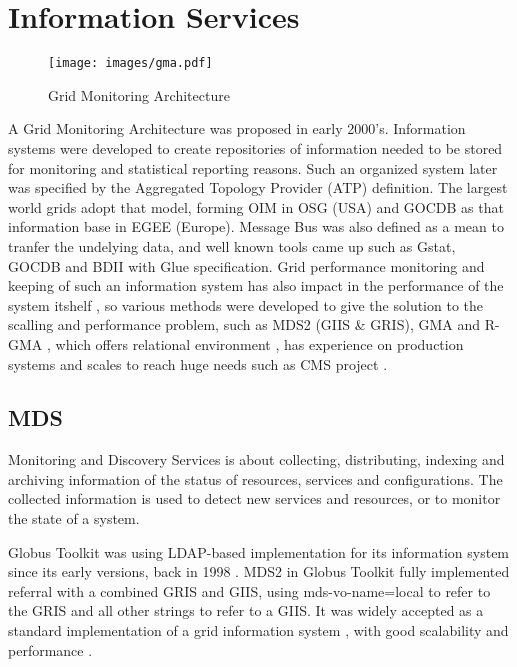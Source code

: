 \section{Information Services}
\begin{figure}[htb]
\centering
 \texttt{[image: images/gma.pdf]}
\caption{Grid Monitoring Architecture}
\label{figure:gma}
\end{figure}
A Grid Monitoring Architecture \cite{tierney2002grid} was proposed in early
2000's. Information systems were developed to create repositories of information
needed to be stored for monitoring and statistical reporting reasons. Such an
organized system later was specified by the Aggregated Topology Provider (ATP)
definition. The largest world grids adopt that model, forming OIM in OSG (USA)
and GOCDB as that information base in EGEE (Europe). Message Bus was also
defined as a mean to tranfer the undelying data, and well known tools came up
such as Gstat, GOCDB and BDII with Glue specification. Grid performance
monitoring and keeping of such an information system has also impact in the
performance of the system itshelf \cite{zhang2003performance}, so various
methods were developed to give the solution to the scalling and performance
problem, such as MDS2 (GIIS \& GRIS), GMA and R-GMA
\cite{wilson2004information}, which offers relational environment
\cite{fisher2001relational}, has experience on production systems 
\cite{byrom-production} and scales to reach huge needs such as CMS project
\cite{Bonacorsi2004,Byrom}.

\subsection{MDS}
Monitoring and Discovery Services is about collecting, distributing, indexing
and archiving information of the status of resources, services and
configurations. The collected information is used to detect new services and
resources, or to monitor the state of a system.

Globus Toolkit was using LDAP-based implementation for its information system
since its early versions, back in 1998 \cite{von1998usage}. MDS2 in Globus
Toolkit fully implemented referral with a combined GRIS and GIIS, using
mds-vo-name=local to refer to the GRIS and all other strings to refer to a
GIIS. It was widely accepted as a standard implementation of a grid information
system \cite{945188}, with good scalability and performance
\cite{zhang2004performance}.


